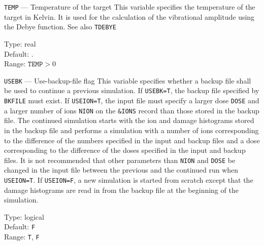 \begin{keydescription}{\texttt{TEMP} --- Temperature of the target}
%
  This variable specifies the temperature of the target in Kelvin. It is used 
  for the calculation of the vibrational amplitude using the Debye
  function. See also \texttt{TDEBYE}

  \begin{keytab}
    Type:    \> real \\
    Default: . \\
    Range:   \> $\texttt{TEMP} > 0$
  \end{keytab}
\end{keydescription}

\begin{keydescription}{\texttt{USEBK} --- Use-backup-file flag}
%
  This variable specifies whether a backup file shall be used to
  continue a previous simulation. If \texttt{USEBK=T}, the backup file
  specified by \texttt{BKFILE} must exist. If \texttt{USEION=T}, the
  input file must specify a larger dose \texttt{DOSE} and a larger
  number of ions \texttt{NION} on the \texttt{\&IONS} record than
  those stored in the backup file. The continued simulation starts
  with the ion and damage histograms stored in the backup file and
  performs a simulation with a number of ions corresponding to the
  difference of the numbers specified in the input and backup files
  and a dose corresponding to the difference of the doses specified in
  the input and backup files.  It is not recommended that other
  parameters than \texttt{NION} and \texttt{DOSE} be changed in the
  input file between the previous and the continued run when
  \texttt{USEION=T}.  If \texttt{USEION=F}, a new simulation is
  started from scratch except that the damage histograms are read in
  from the backup file at the beginning of the simulation.
%
  \begin{keytab}
    Type:    \> logical \\
    Default: \> \texttt{F} \\
    Range:   \> \texttt{T}, \texttt{F}
  \end{keytab}
\end{keydescription}


